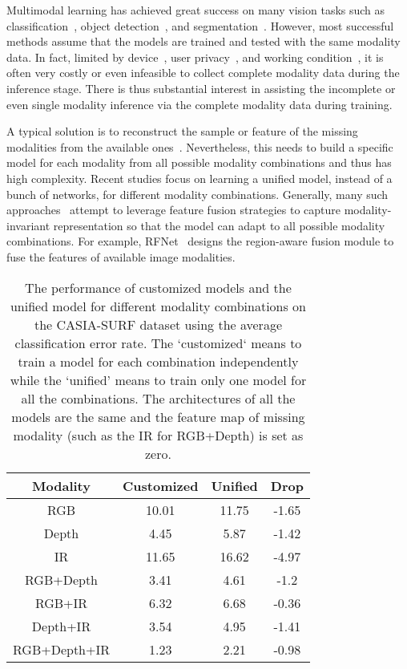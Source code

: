 \documentclass[10pt,twocolumn,letterpaper]{article}
\begin{document}
Multimodal learning has achieved great success on many vision tasks such as classification~\cite{mm_cf1,mm_cf2,mm_cf3}, object detection~\cite{mm_detection1,mm_detection2,mm_detection3}, and segmentation~\cite{rgbd_seg1,rgbd_seg2,rgbd_seg3}. However, most successful methods assume that the models are trained and tested with the same modality data. In fact, limited by device~\cite{spcical-gan1,device1}, user privacy~\cite{privacy1,privacy2}, and working condition~\cite{special-hall1,special-hall2}, it is often very costly or even infeasible to collect complete modality data during the inference stage. There is thus substantial interest in assisting the incomplete or even single modality inference via the complete modality data during training.

A typical solution is to reconstruct the sample or feature of the missing modalities from the available ones~\cite{special-hall2,special-hall3,special-hall4,special-hall5,special-hall7,spcical-gan1}. Nevertheless, this needs to build a specific model for each modality from all possible modality combinations and thus has high complexity. Recent studies focus on learning a unified model, instead of a bunch of networks, for different modality combinations. Generally, many such approaches~\cite{rfnet,mmformer,robust,hemis,hetero,lcr} attempt to leverage feature fusion strategies to capture modality-invariant representation so that the model can adapt to all possible modality combinations. For example, RFNet~\cite{rfnet} designs the region-aware fusion module to fuse the features of available image modalities. 


\begin{table}[]
\centering
\renewcommand\tabcolsep{8.0pt}
\begin{tabular}{cccc}
\toprule[1pt]
Modality   & Customized & Unified & Drop \\ \toprule[1pt]
RGB       & 10.01 & 11.75     & -1.65 \\ 
Depth      & 4.45 & 5.87      & -1.42  \\ 
IR        &11.65 & 16.62    &  -4.97  \\ 
RGB+Depth    & 3.41 & 4.61     &  -1.2  \\ 
RGB+IR      & 6.32  & 6.68     & -0.36  \\ 
Depth+IR     & 3.54  & 4.95     & -1.41  \\ 
RGB+Depth+IR    & 1.23 & 2.21     & -0.98  \\ \toprule[1pt]
\end{tabular}
\caption{The performance of customized models and the unified model for different modality combinations on the CASIA-SURF dataset using the average classification error rate. The `customized` means to train a model for each combination independently while the `unified' means to train only one model for all the combinations. The architectures of all the models are the same and the feature map of missing modality (such as the IR for RGB+Depth) is set as zero.}
\label{PVU}
\end{table}
\end{document}
